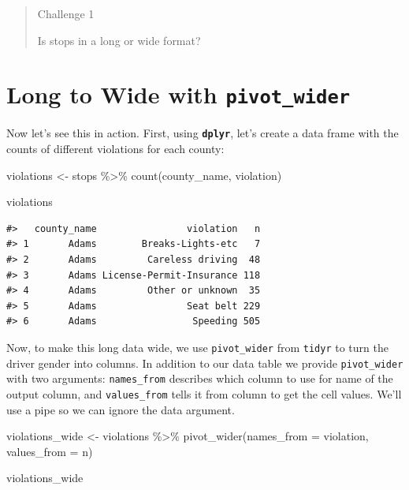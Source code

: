 \documentclass[
]{book}
\newenvironment{Shaded}{\begin{snugshade}}{\end{snugshade}}
\newcommand{\AttributeTok}[1]{\textcolor[rgb]{0.77,0.63,0.00}{#1}}
\newcommand{\FunctionTok}[1]{\textcolor[rgb]{0.00,0.00,0.00}{#1}}
\newcommand{\NormalTok}[1]{#1}
\newcommand{\OtherTok}[1]{\textcolor[rgb]{0.56,0.35,0.01}{#1}}
\newcommand{\SpecialCharTok}[1]{\textcolor[rgb]{0.00,0.00,0.00}{#1}}
\begin{document}
\begin{quote}
Challenge 1

Is stops in a long or wide format?
\end{quote}

\hypertarget{long-to-wide-with-pivot_wider}{%
\section{\texorpdfstring{Long to Wide with \texttt{pivot\_wider}}{Long to Wide with pivot\_wider}}\label{long-to-wide-with-pivot_wider}}

Now let's see this in action. First, using \textbf{\texttt{dplyr}}, let's create a data frame with the counts of different violations for each county:

\begin{Shaded}
\begin{Highlighting}[]
\NormalTok{violations }\OtherTok{\textless{}{-}}\NormalTok{ stops }\SpecialCharTok{\%\textgreater{}\%}
  \FunctionTok{count}\NormalTok{(county\_name, violation)}

\NormalTok{violations}
\end{Highlighting}
\end{Shaded}

\begin{verbatim}
#>   county_name                violation   n
#> 1       Adams        Breaks-Lights-etc   7
#> 2       Adams         Careless driving  48
#> 3       Adams License-Permit-Insurance 118
#> 4       Adams         Other or unknown  35
#> 5       Adams                Seat belt 229
#> 6       Adams                 Speeding 505
\end{verbatim}

Now, to make this long data wide, we use \texttt{pivot\_wider} from \texttt{tidyr} to turn the driver gender into columns. In addition to our data table we provide \texttt{pivot\_wider} with two arguments: \texttt{names\_from} describes which column to use for name of the output column, and \texttt{values\_from} tells it from column to get the cell values. We'll use a pipe so we can ignore the data argument.

\begin{Shaded}
\begin{Highlighting}[]
\NormalTok{violations\_wide }\OtherTok{\textless{}{-}}\NormalTok{ violations }\SpecialCharTok{\%\textgreater{}\%}
  \FunctionTok{pivot\_wider}\NormalTok{(}\AttributeTok{names\_from =}\NormalTok{ violation, }
              \AttributeTok{values\_from =}\NormalTok{ n) }

\NormalTok{violations\_wide}
\end{Highlighting}
\end{Shaded}
\end{document}
